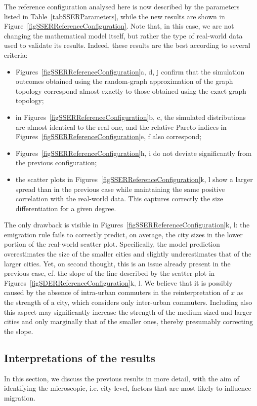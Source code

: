 \documentclass[a4paper]{article}
\begin{document}
The reference configuration analysed here is now described by the parameters listed in Table~\ref{tabSSERParameters}, while the new results are shown in Figure~\ref{figSSERReferenceConfiguration}. Note that, in this case, we are not changing the mathematical model itself, but rather the type of real-world data used to validate its results. Indeed, these results are the best according to several criteria:
\begin{itemize}
\item Figures~\ref{figSSERReferenceConfiguration}a, d, j confirm that the simulation outcomes obtained using the random-graph approximation of the graph topology correspond almost exactly to those obtained using the exact graph topology;
\item in Figures~\ref{figSSERReferenceConfiguration}b, c, the simulated distributions are almost identical to the real one, and the relative Pareto indices in Figures~\ref{figSSERReferenceConfiguration}e, f also correspond;
\item Figures~\ref{figSSERReferenceConfiguration}h, i do not deviate significantly from the previous configuration;
\item the scatter plots in Figures~\ref{figSSERReferenceConfiguration}k, l show a larger spread than in the previous case while maintaining the same positive correlation with the real-world data. This captures correctly the size differentiation for a given degree.
\end{itemize}
    
The only drawback is visible in Figures~\ref{figSSERReferenceConfiguration}k, l: the emigration rule fails to correctly predict, on average, the city sizes in the lower portion of the real-world scatter plot. Specifically, the model prediction overestimates the size of the smaller cities and slightly underestimates that of the larger cities. Yet, on second thought, this is an issue already present in the previous case, cf. the slope of the line described by the scatter plot in Figures~\ref{figSDERReferenceConfiguration}k, l. We believe that it is possibly caused by the absence of intra-urban commuters in the reinterpretation of $x$ as the strength of a city, which considers only inter-urban commuters. Including also this aspect may significantly increase the strength of the medium-sized and larger cities and only marginally that of the smaller ones, thereby presumably correcting the slope.

\subsection{Interpretations of the results}
\label{secInterpretations}
%
In this section, we discuss the previous results in more detail, with the aim of identifying the microscopic, i.e. city-level, factors that are most likely to influence migration.
        
\end{document}
